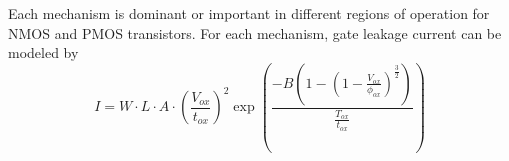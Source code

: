 Each mechanism is dominant or important in different regions of operation for NMOS and PMOS transistors. For each mechanism, gate leakage current can be modeled by
\begin{equation}
I = W \cdot L \cdot A \cdot \left(\frac{V_{ox}}{t_{ox}}\right)^2\exp\left(\frac{-B\left(1-\left(1-\frac{V_{ox}}{\phi_{ox}}\right)^{\frac{3}{2}}\right)}{\frac{T_{ox}}{t_{ox}}}\right)
\end{equation}
